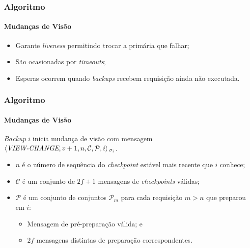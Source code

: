 \documentclass{beamer}
\begin{document}
\begin{frame}
  \frametitle{Algoritmo}
  \framesubtitle{Mudanças de Visão}

  \begin{itemize}
    \item
      Garante \textit{liveness} permitindo trocar a primária que falhar;

    \item
      São ocasionadas por \textit{timeouts};

    \item
      Esperas ocorrem quando \textit{backups} recebem requisição ainda não executada.
  \end{itemize}
\end{frame}

\begin{frame}
  \frametitle{Algoritmo}
  \framesubtitle{Mudanças de Visão}

  \textit{Backup} $i$ inicia mudança de visão com mensagem $\braket{\textit{VIEW-CHANGE}, v + 1, n, \mathcal{C}, \mathcal{P}, i}{}_{\sigma_i}$.
  \begin{itemize}
    \item
      $n$ é o número de sequência do \textit{checkpoint} estável mais recente que $i$ conhece;

    \item
      $\mathcal{C}$ é um conjunto de $2f + 1$ mensagens de \textit{checkpoints} válidas;

    \item
      $\mathcal{P}$ é um conjunto de conjuntos $\mathcal{P}_m$ para cada requisição $m > n$ que preparou em $i$:
      \begin{itemize}
        \item
          Mensagem de pré-preparação válida; e
        
        \item
          $2f$ mensagens distintas de preparação correspondentes.
      \end{itemize}
  \end{itemize}
\end{frame}
\end{document}
